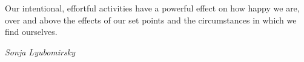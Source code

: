\epigraph{Our intentional, effortful activities have a powerful effect on how happy we are, over and above the effects of our set points and the circumstances in which we find ourselves.}{\textit{Sonja Lyubomirsky}}